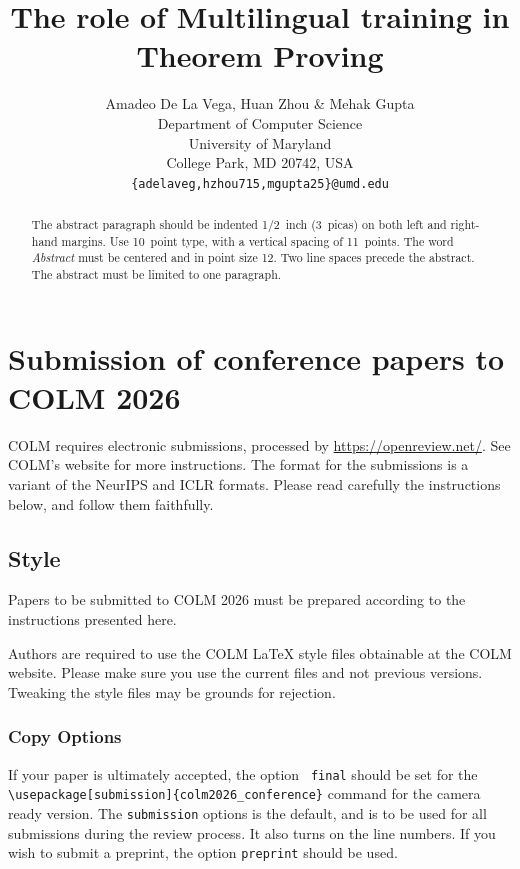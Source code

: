 \documentclass{article} %
\title{The role of Multilingual training in Theorem Proving}
\author{Amadeo De La Vega, Huan Zhou \& Mehak Gupta \\ %
Department of Computer Science\\
University of Maryland\\
College Park, MD 20742, USA \\
\texttt{\{adelaveg,hzhou715,mgupta25\}@umd.edu}
}
\begin{document}
\ifcolmfinal
\linenumbers
\fi

\maketitle

\begin{abstract}
The abstract paragraph should be indented 1/2~inch (3~picas) on both left and
right-hand margins. Use 10~point type, with a vertical spacing of 11~points.
The word \textit{Abstract} must be centered and in point size 12. Two
line spaces precede the abstract. The abstract must be limited to one
paragraph.
\end{abstract}

\section{Submission of conference papers to COLM 2026}

COLM requires electronic submissions, processed by
\url{https://openreview.net/}. See COLM's website for more instructions.
The format for the submissions is a variant of the NeurIPS and ICLR formats.
Please read carefully the instructions below, and follow them
faithfully.


\subsection{Style}

Papers to be submitted to COLM 2026 must be prepared according to the
instructions presented here.


Authors are required to use the COLM \LaTeX{} style files obtainable at the
COLM website. Please make sure you use the current files and
not previous versions. Tweaking the style files may be grounds for rejection.

\subsubsection{Copy Options}

If your paper is ultimately accepted, the option {\tt
  {final}} should be set  for the {\tt {\textbackslash}usepackage[submission]\{colm2026\_conference\}} command for the camera ready version. The {\tt submission} options is the default, and is to be used for all submissions during the review process. It also turns on the line numbers. If you wish to submit a preprint, the option {\tt preprint} should be used.
  
\end{document}
